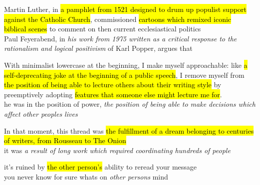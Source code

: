 \documentclass[
]{article}
\begin{document}
Martin Luther, in \hl{a pamphlet from 1521 designed to drum up populist
support against the Catholic Church}, commissioned \hl{cartoons which
remixed iconic biblical scenes} to comment on then current
ecclesiastical politics\\
Paul Feyerabend, in \emph{his work from 1975 written as a critical
response to the rationalism and logical positivism} of Karl Popper,
argues that

With minimalist lowercase at the beginning, I make myself approachable:
like \hl{a self-deprecating joke at the beginning of a public speech}, I
remove myself from \hl{the position of being able to lecture others
about their writing style} by preemptively adopting \hl{features that
someone else might lecture me for}.\\
he was in the position of power, \emph{the position of being able to
make decisions which affect other people\textquotesingle s lives}

In that moment, this thread was \hl{the fulfillment of a dream belonging
to centuries of writers, from Rousseau to The Onion}\\
it was \emph{a result of long work which required coordinating hundreds
of people}

it's ruined by \hl{the other person's} ability to reread your message\\
you never know for sure what\textquotesingle s on \emph{other
person\textquotesingle s} mind
\end{document}
